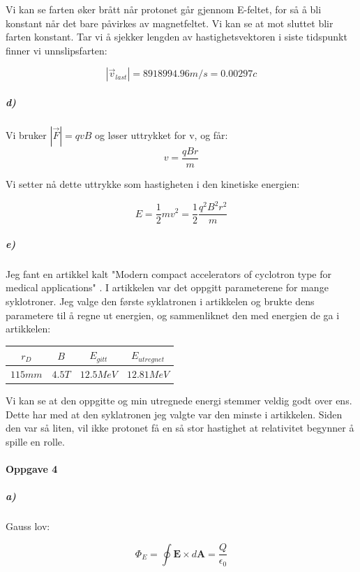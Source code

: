 \documentclass[a4paper,norsk, 10pt]{article}
\begin{document}
Vi kan se farten øker brått når protonet går gjennom E-feltet, for så å bli konstant når det bare påvirkes av magnetfeltet. Vi kan se at mot sluttet blir farten konstant. Tar vi å sjekker lengden av hastighetsvektoren i siste tidspunkt finner vi unnslipsfarten:

$$
|\vec{v}_{last}| = 8918994.96 m/s = 0.00297 c
$$

\subparagraph*{d)}

Vi bruker $|\vec{F}| = qvB$ og løser uttrykket for v, og får:
\begin{equation}
v = \frac{qBr}{m} 
\end{equation}

Vi setter nå dette uttrykke som hastigheten i den kinetiske energien:

\begin{equation}
E = \frac{1}{2}mv^2 = \frac{1}{2} \frac{q^2B^2r^2}{m}
\end{equation}


\subparagraph*{e)}

Jeg fant en artikkel kalt "Modern compact accelerators of cyclotron type for medical applications"  \cite{Smirnov2016}. I artikkelen var det oppgitt parameterene for mange syklotroner. Jeg valge den første syklatronen i artikkelen og brukte dens parametere til å regne ut energien, og sammenliknet den med energien de ga i artikkelen:\\

\begin{center}
\begin{tabular}{|c|c|c|c|}
\hline
$r_D$ & $B$ & $E_{gitt}$ & $E_{utregnet} $ \\ \hline
$115 mm$  & $4.5 T$ & $12.5 MeV$ & $12.81 MeV$ \\ \hline
\end{tabular}
\end{center}

Vi kan se at den oppgitte og min utregnede energi stemmer veldig godt over ens. Dette har med at den syklatronen jeg valgte var den minste i artikkelen. Siden den var så liten, vil ikke protonet få en så stor hastighet at relativitet begynner å spille en rolle.


\paragraph*{Oppgave 4}

\subparagraph*{a)}

Gauss lov:

$$ \Phi_E = \oint \textbf{E} \times d \textbf{A} = \dfrac{Q}{\epsilon_0}$$
\end{document}
